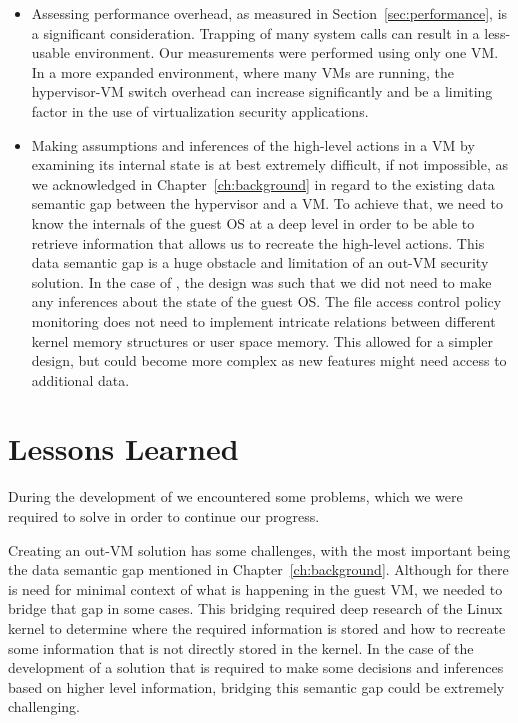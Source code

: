 \begin{itemize}
\item Assessing performance overhead, as measured in Section~\ref{sec:performance}, is a significant consideration. Trapping of many system calls can result in a less-usable environment. Our measurements were performed using only one \ac{VM}. In a more expanded environment, where many \acp{VM} are running, the hypervisor-\ac{VM} switch overhead can increase significantly and be a limiting factor in the use of virtualization security applications.

\item Making assumptions and inferences of the high-level actions in a \ac{VM} by examining its internal state is at best extremely difficult, if not impossible, as we acknowledged in Chapter~\ref{ch:background}  in regard to the existing data semantic gap between the hypervisor and a \ac{VM}. To achieve that, we need to know the internals of the guest \ac{OS} at a deep level in order to be able to retrieve information that allows us to recreate the high-level actions. This data semantic gap is a huge obstacle and limitation of an out-\ac{VM} security solution. In the case of , the design was such that we did not need to make any inferences about the state of the guest \ac{OS}. The file access control policy monitoring does not need to implement intricate relations between different kernel memory structures or user space memory. This allowed for a simpler design, but could become more complex as new features might need access to additional data.
 
\end{itemize} 


\section{Lessons Learned}

\par During the development of  we encountered some problems, which we were required to solve in order to continue our progress.  

\par Creating an out-\ac{VM} solution has some challenges, with the most important being the data semantic gap mentioned in Chapter~\ref{ch:background}. Although for  there is need for minimal context of what is happening in the guest \ac{VM}, we needed to bridge that gap in some cases. This bridging required deep research of the Linux kernel to determine where the required information is stored and how to recreate some information that is not directly stored in the kernel. In the case of the development of a solution that is required to make some decisions and inferences based on higher level information, bridging this semantic gap could be extremely challenging.

